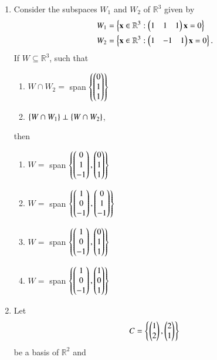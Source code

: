 \renewcommand{\theequation}{\theenumi}
\renewcommand{\thefigure}{\theenumi}
\begin{enumerate}[label=\thesection.\arabic*.,ref=\thesection.\theenumi]

\item Consider the subspaces $W_1$ and $W_2$ of $\mathbb{R}^3$ given by
\begin{align}
W_1 &= \left\{\mathbf{x} \in \mathbb{R}^3: \begin{pmatrix}1 & 1 & 1\end{pmatrix}\mathbf{x} = 0\right\}
\\
W_2 &= \left\{\mathbf{x} \in \mathbb{R}^3: \begin{pmatrix}1 & -1 & 1\end{pmatrix}\mathbf{x} = 0\right\}.
\end{align}
If $W \subseteq \mathbb{R}^3$, such that 
\begin{enumerate}
\item $W \cap W_2 =$ span $\left\{\begin{pmatrix}0\\1\\1\end{pmatrix}\right\}$
\item $\left\{W \cap W_1\right\} \perp \left\{W \cap W_2\right\}$, 
\end{enumerate}
then 
\begin{enumerate}
\item $W =$ span $\left\{\begin{pmatrix}0\\1\\-1\end{pmatrix},\begin{pmatrix}0\\1\\1\end{pmatrix}\right\}$
\item $W =$ span $\left\{\begin{pmatrix}1\\0\\-1\end{pmatrix},\begin{pmatrix}0\\1\\-1\end{pmatrix}\right\}$
\item $W =$ span $\left\{\begin{pmatrix}1\\0\\-1\end{pmatrix},\begin{pmatrix}0\\1\\1\end{pmatrix}\right\}$
\item $W =$ span $\left\{\begin{pmatrix}1\\0\\-1\end{pmatrix},\begin{pmatrix}1\\0\\1\end{pmatrix}\right\}$
\end{enumerate}
\item Let
\begin{align}
C = \left\{\begin{pmatrix}1 \\ 2\end{pmatrix},\begin{pmatrix}2 \\ 1\end{pmatrix}\right\}
\end{align}
be a basis of $\mathbb{R}^2$ and 

\end{enumerate}
